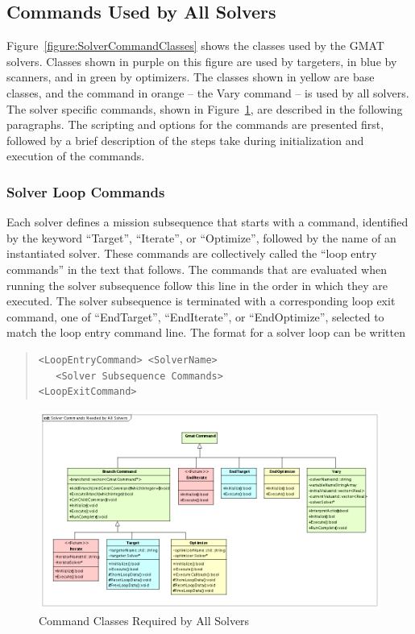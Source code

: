 \subsection{\label{section:SolverCommandDescriptions}Commands Used by All Solvers}

Figure~\ref{figure:SolverCommandClasses} shows the classes used by the GMAT solvers.  Classes shown
in purple on this figure are used by targeters, in blue by scanners, and in green by optimizers.
The classes shown in yellow are base classes, and the command in orange -- the Vary command --
is used by all solvers. The solver specific commands, shown in
Figure~\ref{figure:SolverCommandsCommon}, are described in the following paragraphs.  The scripting
and options for the commands are presented first, followed by a brief description of the steps take
during initialization and execution of the commands.

\subsubsection{Solver Loop Commands}

Each solver defines a mission subsequence that starts with a command, identified by the keyword
``Target'', ``Iterate'', or ``Optimize'', followed by the name of an instantiated solver.  These
commands are collectively called the ``loop entry commands'' in the text that follows.  The commands
that are evaluated when running the solver subsequence follow this line in the order in which they
are executed.  The solver subsequence is terminated with a corresponding loop exit command, one of
``EndTarget'', ``EndIterate'', or ``EndOptimize'', selected to match the loop entry command line.
The format for a solver loop can be written

\begin{quote}
\begin{verbatim}
<LoopEntryCommand> <SolverName>
   <Solver Subsequence Commands>
<LoopExitCommand>
\end{verbatim}
\end{quote}

\begin{figure}
\begin{center}
\includegraphics[400,233]{Images/SolverCommandsNeededbyAllSolvers.png}
\caption{\label{figure:SolverCommandsCommon}Command Classes Required by All Solvers}
\end{center}
\end{figure}

